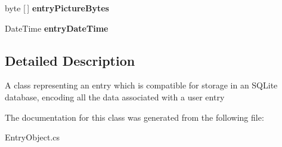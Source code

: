 \begin{DoxyCompactItemize}
\item 
\mbox{\label{class_intention_journal_1_1_entry_object_a2a368c8c0c945956c419b7610e5d1fb4}} 
byte \mbox{[}$\,$\mbox{]} {\bfseries entry\+Picture\+Bytes}
\item 
\mbox{\label{class_intention_journal_1_1_entry_object_a493858b8b98ea84a1a88292c2a9e6342}} 
Date\+Time {\bfseries entry\+Date\+Time}
\end{DoxyCompactItemize}


\subsection{Detailed Description}
A class representing an entry which is compatible for storage in an S\+Q\+Lite database, encoding all the data associated with a user entry 



The documentation for this class was generated from the following file\+:\begin{DoxyCompactItemize}
\item 
Entry\+Object.\+cs\end{DoxyCompactItemize}
